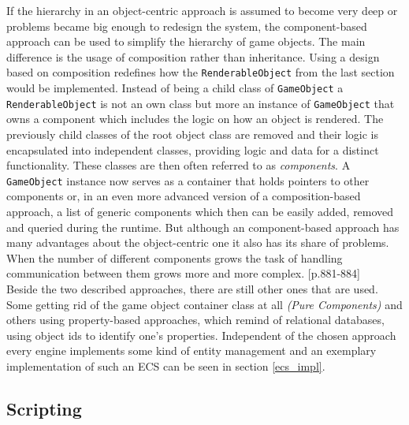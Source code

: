 If the hierarchy in an object-centric approach is assumed to become very deep or problems became big enough to redesign the system, the component-based approach can be used to simplify the hierarchy of game objects. The main difference is the usage of composition rather than inheritance. Using a design based on composition redefines how the \texttt{RenderableObject} from the last section would be implemented. Instead of being a child class of \texttt{GameObject} a \texttt{RenderableObject} is not an own class but more an instance of \texttt{GameObject} that owns a component which includes the logic on how an object is rendered. The previously child classes of the root object class are removed and their logic is encapsulated into independent classes, providing logic and data for a distinct functionality. These classes are then often referred to as \textit{components}. A \texttt{GameObject} instance now serves as a container that holds pointers to other components or, in an even more advanced version of a composition-based approach, a list of generic components which then can be easily added, removed and queried during the runtime. But although an component-based approach has many advantages about the object-centric one it also has its share of problems. When the number of different components grows the task of handling communication between them grows more and more complex. \cite{GEA_2}[p.881-884] \\

\noindent
Beside the two described approaches, there are still other ones that are used. Some getting rid of the game object container class at all \textit{(Pure Components)} and others using property-based approaches, which remind of relational databases, using object ids to identify one's properties. Independent of the chosen approach every engine implements some kind of entity management and an exemplary implementation of such an \acl{ECS} can be seen in section \ref{ecs_impl}.

\subsection{Scripting}

